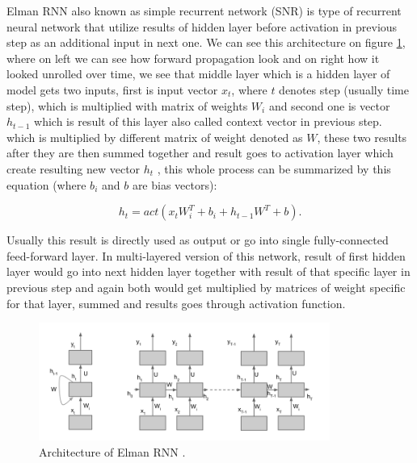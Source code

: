 Elman RNN also known as simple recurrent network (SNR) is type of recurrent neural network that utilize results of hidden layer before activation in previous step as an additional input in next one. We can see this architecture on figure \ref{fig:elman_arch}, where on left we can see how forward propagation look and on right how it looked unrolled over time, we see that middle layer which is a hidden layer of model gets two inputs, first is input vector $x_t$, where $t$ denotes step (usually time step), which is multiplied with matrix of weights $W_i$ and second one is vector $h_{t-1}$ which is result of this layer also called context vector in previous step. which is multiplied by different matrix of weight denoted as $W$, these two results after they are then summed together and result goes to activation layer which create resulting new vector $h_t$ \cite{elman}, this whole process can be summarized by this equation (where $b_i$ and $b$ are bias vectors):

\begin{equation}
	\label{eqn:elman}
	h_t = act(x_t W^T_i + b_i + h_{t-1} W^T + b).
\end{equation} 

Usually this result is directly used as output or go into single fully-connected feed-forward layer. In multi-layered version of this network, result of first hidden layer would go into next hidden layer together with result of that specific layer in previous step and again both would get multiplied by matrices of weight specific for that layer, summed and results goes through activation function.
\\

\begin{figure}[!h]
	\centering
	
	\includegraphics[width=0.85\textwidth]{images/Elman_RNN_architecture.png}
	
	\caption{Architecture of Elman RNN \cite{elman_img}.}
	\label{fig:elman_arch}
\end{figure}

  

